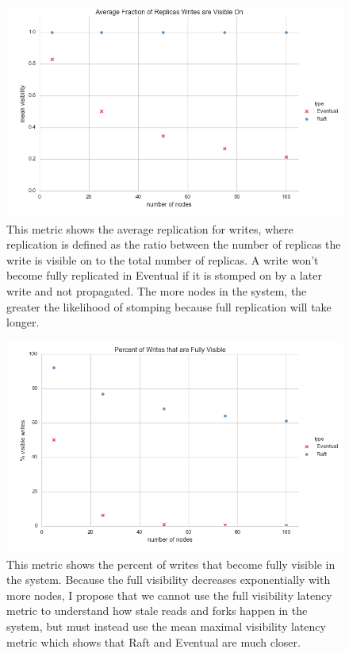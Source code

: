 \documentclass[11pt,letterpaper]{article}
\begin{document}
\begin{figure}[!h]
    \centering
        \includegraphics[width=\textwidth]{hcfigures/mean_visibility.png}
        \caption{\textsf{This metric shows the average replication for writes, where replication is defined as the ratio between the number of replicas the write is visible on to the total number of replicas. A write won't become fully replicated in Eventual if it is stomped on by a later write and not propagated. The more nodes in the system, the greater the likelihood of stomping because full replication will take longer.}}
        \label{fig:mean_visibility}
\end{figure}


\begin{figure}[!h]
    \centering
        \includegraphics[width=\textwidth]{hcfigures/visible_writes.png}
        \caption{\textsf{This metric shows the percent of writes that become fully visible in the system. Because the full visibility decreases exponentially with more nodes, I propose that we cannot use the full visibility latency metric to understand how stale reads and forks happen in the system, but must instead use the mean maximal visibility latency metric which shows that Raft and Eventual are much closer.}}
        \label{fig:visible_writes}
\end{figure}
\end{document}
